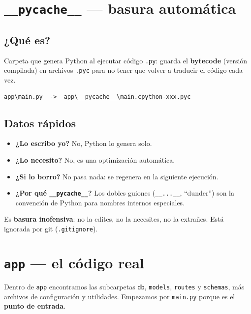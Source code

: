 \documentclass[11pt,a4paper]{article}
\begin{document}
\section{\texttt{\_\_pycache\_\_} --- basura automática}

\subsection{¿Qué es?}

Carpeta que genera Python al ejecutar código \texttt{.py}: guarda el \textbf{bytecode}
(versión compilada) en archivos \texttt{.pyc} para no tener que volver a traducir el código cada vez.

\begin{lstlisting}
app\main.py  ->  app\__pycache__\main.cpython-xxx.pyc
\end{lstlisting}

\subsection{Datos rápidos}

\begin{itemize}
    \item \textbf{¿Lo escribo yo?} No, Python lo genera solo.
    \item \textbf{¿Lo necesito?} No, es una optimización automática.
    \item \textbf{¿Si lo borro?} No pasa nada: se regenera en la siguiente ejecución.
    \item \textbf{¿Por qué \texttt{\_\_pycache\_\_}?} Los dobles guiones (\texttt{\_\_...\_\_}, ``dunder'')
    son la convención de Python para nombres internos especiales.
\end{itemize}

\begin{recuadro}
Es \textbf{basura inofensiva}: no la edites, no la necesites, no la extrañes.
Está ignorada por git (\texttt{.gitignore}).
\end{recuadro}

\section{\texttt{app} --- el código real}

Dentro de \texttt{app} encontramos las subcarpetas \texttt{db}, \texttt{models},
\texttt{routes} y \texttt{schemas}, más archivos de configuración y utilidades.
Empezamos por \texttt{main.py} porque es el \textbf{punto de entrada}.
\end{document}
